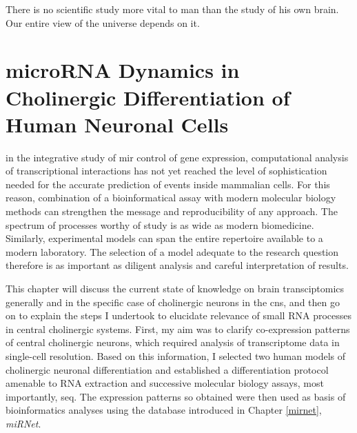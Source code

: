 \begin{savequote}[60mm]
There is no scientific study more vital to man than the study of his own brain. Our entire view of the universe depends on it.
\end{savequote}





\chapter{microRNA Dynamics in Cholinergic Differentiation of Human Neuronal Cells}

 in the integrative study of \ac{mir} control of gene expression, computational analysis of transcriptional interactions has not yet reached the level of sophistication needed for the accurate prediction of events inside mammalian cells. For this reason, combination of a bioinformatical assay with modern molecular biology methods can strengthen the message and reproducibility of any approach. The spectrum of processes worthy of study is as wide as modern biomedicine. Similarly, experimental models can span the entire repertoire available to a modern laboratory. The selection of a model adequate to the research question therefore is as important as diligent analysis and careful interpretation of results.

This chapter will discuss the current state of knowledge on brain transciptomics generally and in the specific case of cholinergic neurons in the \ac{cns}, and then go on to explain the steps I undertook to elucidate relevance of small RNA processes in central cholinergic systems. First, my aim was to clarify co-expression patterns of central cholinergic neurons, which required analysis of transcriptome data in single-cell resolution. Based on this information, I selected two human models of cholinergic neuronal differentiation and established a differentiation protocol amenable to RNA extraction and successive molecular biology assays, most importantly, \ac{seq}. The expression patterns so obtained were then used as basis of bioinformatics analyses using the database introduced in Chapter \ref{mirnet}, \textit{miRNet}. 

